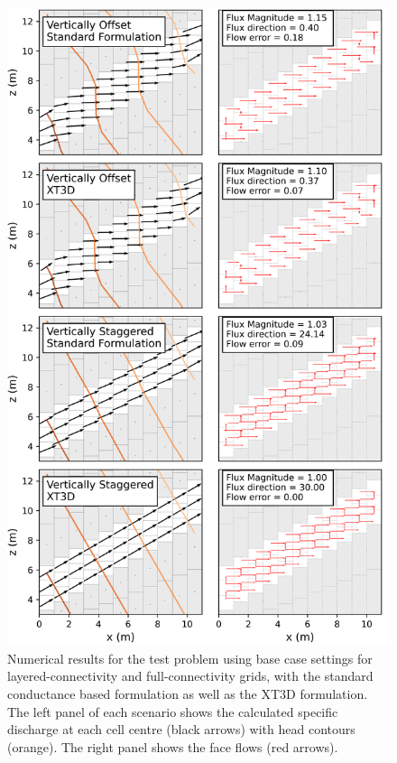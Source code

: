 \documentclass{article}
\begin{document}
\begin{figure}[p!]
	\begin{center}
	\includegraphics[scale=0.8]{../figures/fig2_paper.png}
	\caption{Numerical results for the test problem using base case settings for layered-connectivity and full-connectivity grids, with the standard conductance based formulation as well as the XT3D formulation. The left panel of each scenario shows the calculated specific discharge at each cell centre (black arrows) with head contours (orange). The right panel shows the face flows (red arrows).}
	\label{fig:fig2}
	\end{center}
\end{figure}
\end{document}
